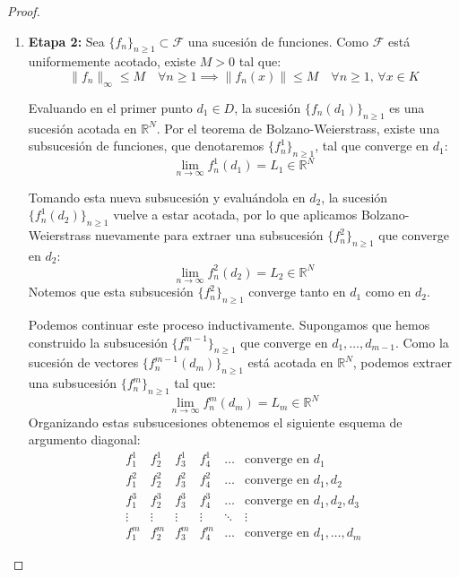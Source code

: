 \begin{proof}
\begin{enumerate}
        Veamos que $\overline{D} = K$. Dado cualquier $x \in K$ y cualquier $n \geq 1$, por la propiedad del recubrimiento sabemos que existe algún índice $j(x,n) \in \{1, \dots, p(n)\}$ tal que $x \in B_{\frac{1}{n}}(x_{n,j(x,n)})$. Entonces:
        \[
            \|x - x_{n,j(x,n)}\| < \frac{1}{n} \implies \lim_{n \to \infty} x_{n,j(x,n)} = x
        \]
        Como $x_{n,j(x,n)} \in D$, hemos encontrado una sucesión en $D$ que converge a $x$. Luego $D$ es denso en $K$.

        \item \textbf{Etapa 2:} Sea $\{f_n\}_{n \geq 1} \subset \mathcal{F}$ una sucesión de funciones. Como $\mathcal{F}$ está uniformemente acotado, existe $M > 0$ tal que:
        \[
            \|f_n\|_\infty \leq M \quad \forall n \geq 1 \implies \| f_n(x) \| \leq M \quad \forall n \geq 1, \, \forall x \in K
        \]

        Evaluando en el primer punto $d_1 \in D$, la sucesión $\{f_n(d_1)\}_{n \geq 1}$ es una sucesión acotada en $\mathbb{R}^N$. Por el teorema de Bolzano-Weierstrass, existe una subsucesión de funciones, que denotaremos $\{f_n^1\}_{n \geq 1}$, tal que converge en $d_1$:
        \[
            \lim_{n \to \infty} f_n^1(d_1) = L_1 \in \mathbb{R}^N
        \]

        Tomando esta nueva subsucesión y evaluándola en $d_2$, la sucesión $\{f_n^1(d_2)\}_{n \geq 1}$ vuelve a estar acotada, por lo que aplicamos Bolzano-Weierstrass nuevamente para extraer una subsucesión $\{f_n^2\}_{n \geq 1}$ que converge en $d_2$:
        \[
            \lim_{n \to \infty} f_n^2(d_2) = L_2 \in \mathbb{R}^N
        \]
        Notemos que esta subsucesión $\{f_n^2\}_{n \geq 1}$ converge tanto en $d_1$ como en $d_2$.

        Podemos continuar este proceso inductivamente. Supongamos que hemos construido la subsucesión $\{f_n^{m-1}\}_{n \geq 1}$ que converge en $d_1, \dots, d_{m-1}$. Como la sucesión de vectores $\{f_n^{m-1}(d_m)\}_{n \geq 1}$ está acotada en $\mathbb{R}^N$, podemos extraer una subsucesión $\{f_n^m\}_{n \geq 1}$ tal que:
        \[
            \lim_{n \to \infty} f_n^m(d_m) = L_m \in \mathbb{R}^N
        \]
        Organizando estas subsucesiones obtenemos el siguiente esquema de argumento diagonal:
        \[
            \begin{matrix}
                \boxed{f_1^1} & f_2^1 & f_3^1 & f_4^1 & \dots & \text{converge en } d_1 \\
                f_1^2 & \boxed{f_2^2} & f_3^2 & f_4^2 & \dots & \text{converge en } d_1, d_2 \\
                f_1^3 & f_2^3 & \boxed{f_3^3} & f_4^3 & \dots & \text{converge en } d_1, d_2, d_3 \\
                \vdots & \vdots & \vdots & \vdots & \ddots & \vdots \\
                f_1^{m} & f_2^{m} & f_3^{m} & f_4^{m} & \dots & \text{converge en } d_1, \dots, d_m
            \end{matrix}
        \]


\end{enumerate}
\end{proof}
